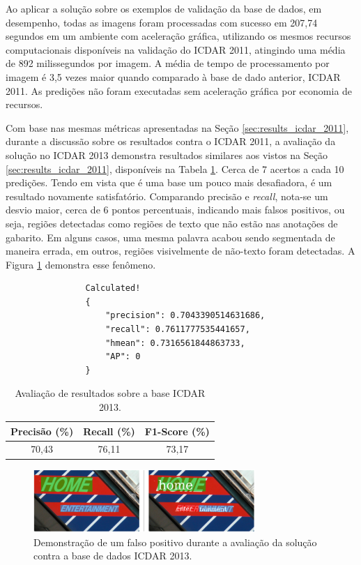Ao aplicar a solução sobre os exemplos de validação da base de dados, em desempenho, todas as imagens foram processadas com sucesso 
em 207,74 segundos em um ambiente com aceleração gráfica, utilizando os mesmos recursos computacionais disponíveis na validação do 
ICDAR 2011, atingindo uma média de 892 milissegundos por imagem. A média de tempo de processamento por imagem é 3,5 vezes maior 
quando comparado à base de dado anterior, ICDAR 2011.  As predições não foram executadas sem aceleração gráfica por economia de 
recursos.

Com base nas mesmas métricas apresentadas na Seção \ref{sec:results_icdar_2011}, durante a discussão sobre os resultados contra 
o ICDAR 2011, a avaliação da solução no ICDAR 2013 demonstra resultados similares aos vistos na Seção \ref{sec:results_icdar_2011}, 
disponíveis na Tabela \ref{tab:icdar13_results}. Cerca de 7 acertos a cada 10 predições. Tendo em vista que é uma base um pouco 
mais desafiadora, é um resultado novamente satisfatório. Comparando precisão e \textit{recall}, nota-se um desvio maior, cerca 
de 6 pontos percentuais, indicando mais falsos positivos, ou seja, regiões detectadas como regiões de texto que não estão nas 
anotações de gabarito. Em alguns casos, uma mesma palavra acabou sendo segmentada de maneira errada, em outros, regiões visivelmente 
de não-texto foram detectadas. A Figura \ref{fig:results_icdar13_01} demonstra esse fenômeno.

\begin{verbatim}
                Calculated!
                {
                    "precision": 0.7043390514631686,
                    "recall": 0.7611777535441657,
                    "hmean": 0.7316561844863733, 
                    "AP": 0
                }
\end{verbatim}

\begin{table}[htb]
    \centering
    \caption{Avaliação de resultados sobre a base ICDAR 2013.}
    \begin{tabular}{|c|c|c|}
        \hline
        Precisão (\%) & Recall (\%) & F1-Score (\%) \\
        \hline
        70,43 & 76,11 & 73,17\\
        \hline
    \end{tabular}
    \label{tab:icdar13_results}
\end{table}

\begin{figure}
    \centering
    \includegraphics[width=0.75\textwidth]{figs/resultados-icdar13-01.png}
    \caption{Demonstração de um falso positivo durante a avaliação da solução contra a base de dados ICDAR 2013.}
    \label{fig:results_icdar13_01}
\end{figure}

